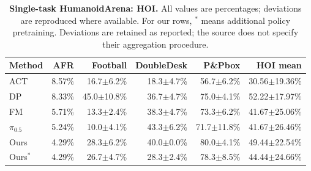 \begin{table}[t]
\centering\small
\caption{\textbf{Single-task HumanoidArena: HOI.} All values are percentages; deviations are reproduced where available. For our rows, $^{*}$ means additional policy pretraining. Deviations are retained as reported; the source does not specify their aggregation procedure.}
\label{tab:supp_single_hoi}
\setlength{\tabcolsep}{4pt}
\begin{tabular}{lrrrrr}\toprule
Method & AFR & Football & DoubleDesk & P\&Pbox & HOI mean\\\midrule
ACT & 8.57\% & 16.7$\pm$6.2\% & 18.3$\pm$4.7\% & 56.7$\pm$6.2\% & 30.56$\pm$19.36\%\\
DP & 8.33\% & 45.0$\pm$10.8\% & 36.7$\pm$4.7\% & 75.0$\pm$4.1\% & 52.22$\pm$17.97\%\\
FM & 5.71\% & 13.3$\pm$2.4\% & 38.3$\pm$4.7\% & 73.3$\pm$6.2\% & 41.67$\pm$25.06\%\\
$\pi_{0.5}$ & 5.24\% & 10.0$\pm$4.1\% & 43.3$\pm$6.2\% & 71.7$\pm$11.8\% & 41.67$\pm$26.46\%\\
Ours & 4.29\% & 28.3$\pm$6.2\% & 40.0$\pm$0.0\% & 80.0$\pm$4.1\% & 49.44$\pm$22.54\%\\
Ours$^{*}$ & 4.29\% & 26.7$\pm$4.7\% & 28.3$\pm$2.4\% & 78.3$\pm$8.5\% & 44.44$\pm$24.66\%\\
\bottomrule\end{tabular}\end{table}
